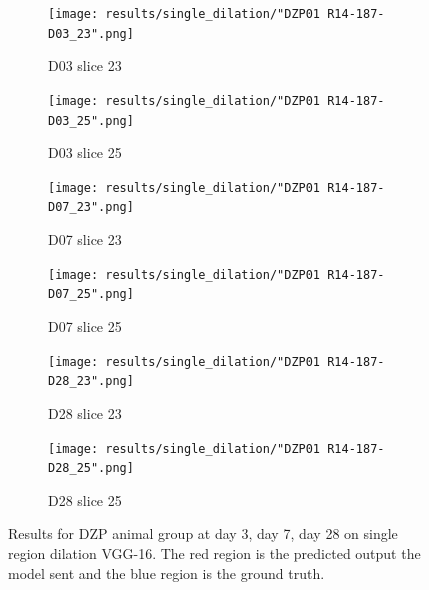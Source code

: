 \begin{figure}[!htb]  
    \centering %

\begin{subfigure}{0.35\textwidth}
  \texttt{[image: results/single\_dilation/"DZP01 R14-187-D03\_23".png]}
  \caption{D03 slice 23}
\end{subfigure}\hfil
\begin{subfigure}{0.35\textwidth}
  \texttt{[image: results/single\_dilation/"DZP01 R14-187-D03\_25".png]}
  \caption{D03 slice 25}
\end{subfigure}

\medskip
\begin{subfigure}{0.35\textwidth}
  \texttt{[image: results/single\_dilation/"DZP01 R14-187-D07\_23".png]}
  \caption{D07 slice 23}
\end{subfigure}\hfil
\begin{subfigure}{0.35\textwidth}
  \texttt{[image: results/single\_dilation/"DZP01 R14-187-D07\_25".png]}
  \caption{D07 slice 25}
\end{subfigure}

\medskip
\begin{subfigure}{0.35\textwidth}
  \texttt{[image: results/single\_dilation/"DZP01 R14-187-D28\_23".png]}
  \caption{D28 slice 23}
\end{subfigure}\hfil
\begin{subfigure}{0.35\textwidth}
  \texttt{[image: results/single\_dilation/"DZP01 R14-187-D28\_25".png]}
  \caption{D28 slice 25}
\end{subfigure}
  
  \caption{Results for DZP animal group at day 3, day 7, day 28 on single region dilation VGG-16. The red region is the predicted output the model sent and the blue region is the ground truth.}
  \label{fig:results_single_dilation_DZP}
\end{figure}



